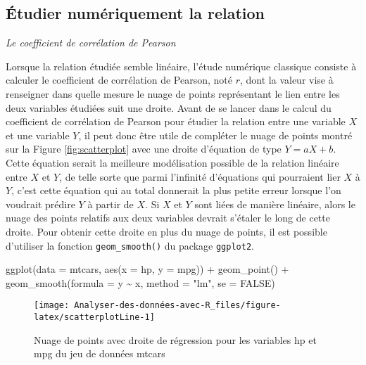 \documentclass[
]{book}
\newenvironment{Shaded}{\begin{snugshade}}{\end{snugshade}}
\newcommand{\AttributeTok}[1]{\textcolor[rgb]{0.77,0.63,0.00}{#1}}
\newcommand{\ConstantTok}[1]{\textcolor[rgb]{0.00,0.00,0.00}{#1}}
\newcommand{\FunctionTok}[1]{\textcolor[rgb]{0.00,0.00,0.00}{#1}}
\newcommand{\NormalTok}[1]{#1}
\newcommand{\SpecialCharTok}[1]{\textcolor[rgb]{0.00,0.00,0.00}{#1}}
\newcommand{\StringTok}[1]{\textcolor[rgb]{0.31,0.60,0.02}{#1}}
\begin{document}
\hypertarget{uxe9tudier-numuxe9riquement-la-relation}{%
\subsection{Étudier numériquement la relation}\label{uxe9tudier-numuxe9riquement-la-relation}}

\emph{Le coefficient de corrélation de Pearson}

Lorsque la relation étudiée semble linéaire, l'étude numérique classique consiste à calculer le coefficient de corrélation de Pearson, noté \(r\), dont la valeur vise à renseigner dans quelle mesure le nuage de points représentant le lien entre les deux variables étudiées suit une droite. Avant de se lancer dans le calcul du coefficient de corrélation de Pearson pour étudier la relation entre une variable \(X\) et une variable \(Y\), il peut donc être utile de compléter le nuage de points montré sur la Figure \ref{fig:scatterplot} avec une droite d'équation de type \(Y = aX + b\). Cette équation serait la meilleure modélisation possible de la relation linéaire entre \(X\) et \(Y\), de telle sorte que parmi l'infinité d'équations qui pourraient lier \(X\) à \(Y\), c'est cette équation qui au total donnerait la plus petite erreur lorsque l'on voudrait prédire \(Y\) à partir de \(X\). Si \(X\) et \(Y\) sont liées de manière linéaire, alors le nuage des points relatifs aux deux variables devrait s'étaler le long de cette droite. Pour obtenir cette droite en plus du nuage de points, il est possible d'utiliser la fonction \texttt{geom\_smooth()} du package \texttt{ggplot2}.

\begin{Shaded}
\begin{Highlighting}[]
\FunctionTok{ggplot}\NormalTok{(}\AttributeTok{data =}\NormalTok{ mtcars, }\FunctionTok{aes}\NormalTok{(}\AttributeTok{x =}\NormalTok{ hp, }\AttributeTok{y =}\NormalTok{ mpg)) }\SpecialCharTok{+} 
  \FunctionTok{geom\_point}\NormalTok{() }\SpecialCharTok{+}
  \FunctionTok{geom\_smooth}\NormalTok{(}\AttributeTok{formula =}\NormalTok{ y }\SpecialCharTok{\textasciitilde{}}\NormalTok{ x, }\AttributeTok{method =} \StringTok{"lm"}\NormalTok{, }\AttributeTok{se =} \ConstantTok{FALSE}\NormalTok{)}
\end{Highlighting}
\end{Shaded}

\begin{figure}

{\centering \texttt{[image: Analyser-des-données-avec-R\_files/figure-latex/scatterplotLine-1]} 

}

\caption{Nuage de points avec droite de régression pour les variables hp et mpg du jeu de données mtcars}\label{fig:scatterplotLine}
\end{figure}
\end{document}
